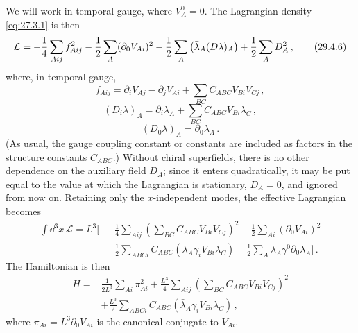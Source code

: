 We will work in temporal gauge, where \(V_A^0=0\). The Lagrangian density
\eqref{eq:27.3.1} is then
\begin{equation}
  \mathcal{L}
  =
  -\frac14\sum_{Aij}f_{Aij}^2
  -\frac12\sum_A(\partial_0V_{Ai})^2
  -\frac12\sum_A\left(\bar\lambda_A(\sl{D}\lambda)_A\right)
  +\frac12\sum_A D_A^2\,,
  \tag{29.4.6}\label{eq:29.4.6}
\end{equation}
where, in temporal gauge,
\begin{equation}
  f_{Aij}
  =
  \partial_iV_{Aj}-\partial_jV_{Ai}
  +\sum_{BC}C_{ABC}V_{Bi}V_{Cj}\,,
  \tag{29.4.7}\label{eq:29.4.7}
\end{equation}
\begin{equation}
  (D_i\lambda)_A
  =
  \partial_i\lambda_A+\sum_{BC}C_{ABC}V_{Bi}\lambda_C\,,
  \tag{29.4.8}\label{eq:29.4.8}
\end{equation}
\begin{equation}
  (D_0\lambda)_A=\partial_0\lambda_A\,.
  \tag{29.4.9}\label{eq:29.4.9}
\end{equation}
(As usual, the gauge coupling constant or constants are included as factors
in the structure constants \(C_{ABC}\).) Without chiral superfields, there
is no other dependence on the auxiliary field \(D_A\); since it enters
quadratically, it may be put equal to the value at which the Lagrangian is
stationary, \(D_A=0\), and ignored from now on. Retaining only the
\(x\)-independent modes, the effective Lagrangian becomes
\begin{equation}
  \begin{aligned}
  \int \dd^3x\,\mathcal{L}
  =L^3\Bigg[
    &-\frac14\sum_{Aij}
      \left(\sum_{BC}C_{ABC}V_{Bi}V_{Cj}\right)^2
     -\frac12\sum_{Ai}(\partial_0V_{Ai})^2
  \\
    &-\frac12\sum_{ABCi}
      C_{ABC}\left(\bar\lambda_A\gamma_iV_{Bi}\lambda_C\right)
     -\frac12\sum_A\bar\lambda_A\gamma^0\partial_0\lambda_A
  \Bigg]\,.
  \end{aligned}
  \tag{29.4.10}\label{eq:29.4.10}
\end{equation}
The Hamiltonian is then
\begin{equation}
  \begin{aligned}
  H={}&
  \frac{1}{2L^3}\sum_{Ai}\pi_{Ai}^2
  +\frac{L^3}{4}\sum_{Aij}
    \left(\sum_{BC}C_{ABC}V_{Bi}V_{Cj}\right)^2
  \\
  &+\frac{L^3}{2}\sum_{ABCi}
    C_{ABC}\left(\bar\lambda_A\gamma_iV_{Bi}\lambda_C\right)\,,
  \end{aligned}
  \tag{29.4.11}\label{eq:29.4.11}
\end{equation}
where \(\pi_{Ai}=L^3\partial_0V_{Ai}\) is the canonical conjugate to
\(V_{Ai}\).

